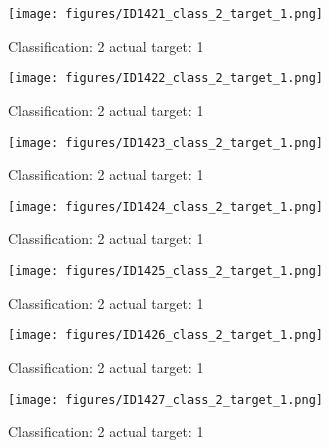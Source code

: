 \begin{figure}[h!]
\begin{center}
\texttt{[image: figures/ID1421\_class\_2\_target\_1.png]}
\end{center}
\caption{ Classification: 2 actual target: 1}
\label{fig:ID1421_class_2_target_1}
\end{figure}
\begin{figure}[h!]
\begin{center}
\texttt{[image: figures/ID1422\_class\_2\_target\_1.png]}
\end{center}
\caption{ Classification: 2 actual target: 1}
\label{fig:ID1422_class_2_target_1}
\end{figure}
\begin{figure}[h!]
\begin{center}
\texttt{[image: figures/ID1423\_class\_2\_target\_1.png]}
\end{center}
\caption{ Classification: 2 actual target: 1}
\label{fig:ID1423_class_2_target_1}
\end{figure}
\begin{figure}[h!]
\begin{center}
\texttt{[image: figures/ID1424\_class\_2\_target\_1.png]}
\end{center}
\caption{ Classification: 2 actual target: 1}
\label{fig:ID1424_class_2_target_1}
\end{figure}
\begin{figure}[h!]
\begin{center}
\texttt{[image: figures/ID1425\_class\_2\_target\_1.png]}
\end{center}
\caption{ Classification: 2 actual target: 1}
\label{fig:ID1425_class_2_target_1}
\end{figure}
\begin{figure}[h!]
\begin{center}
\texttt{[image: figures/ID1426\_class\_2\_target\_1.png]}
\end{center}
\caption{ Classification: 2 actual target: 1}
\label{fig:ID1426_class_2_target_1}
\end{figure}
\begin{figure}[h!]
\begin{center}
\texttt{[image: figures/ID1427\_class\_2\_target\_1.png]}
\end{center}
\caption{ Classification: 2 actual target: 1}
\label{fig:ID1427_class_2_target_1}
\end{figure}
